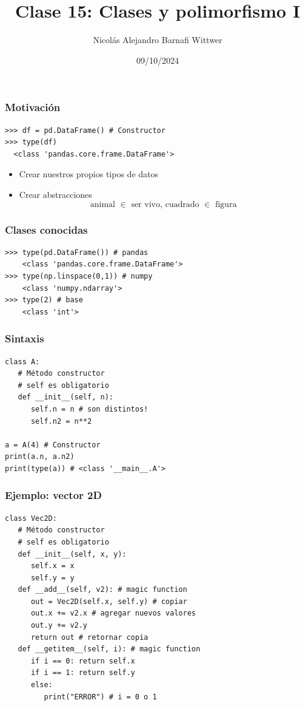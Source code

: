 \documentclass[14pt,aspectratio=169,xcolor=dvipsnames]{beamer}
\title[short title]{Clase 15: Clases y polimorfismo I}
\subtitle{}
\author[NA Barnafi] {Nicolás Alejandro Barnafi Wittwer}
\institute[UC|CMM] 
{
    Pontificia Universidad Católica de Chile \\
    Centro de Modelamiento Matemático
}
\date{09/10/2024}
\begin{document}
\begin{frame}
    \maketitle
\end{frame}
\begin{frame}[fragile]\frametitle{Motivación}
    \begin{verbatim}
>>> df = pd.DataFrame() # Constructor
>>> type(df)
  <class 'pandas.core.frame.DataFrame'>
    \end{verbatim}
    \begin{itemize}
        \item Crear nuestros propios tipos de datos
        \item Crear abstracciones 
    \[ \text{animal $\in$ ser vivo, cuadrado $\in$ figura }\]
    \end{itemize}
\end{frame}
\begin{frame}[fragile]\frametitle{Clases conocidas}
    \begin{verbatim}
>>> type(pd.DataFrame()) # pandas
    <class 'pandas.core.frame.DataFrame'>
>>> type(np.linspace(0,1)) # numpy
    <class 'numpy.ndarray'>
>>> type(2) # base
    <class 'int'>
    \end{verbatim}
\end{frame}
\begin{frame}[fragile]\frametitle{Sintaxis}
    \begin{verbatim}
class A:
   # Método constructor
   # self es obligatorio
   def __init__(self, n):
      self.n = n # son distintos!
      self.n2 = n**2

a = A(4) # Constructor
print(a.n, a.n2)
print(type(a)) # <class '__main__.A'>
    \end{verbatim}

\end{frame}
\begin{frame}[fragile]\frametitle{Ejemplo: vector 2D}
    \begin{footnotesize}
    \begin{verbatim}
class Vec2D:
   # Método constructor
   # self es obligatorio
   def __init__(self, x, y):
      self.x = x 
      self.y = y
   def __add__(self, v2): # magic function
      out = Vec2D(self.x, self.y) # copiar
      out.x += v2.x # agregar nuevos valores
      out.y += v2.y
      return out # retornar copia
   def __getitem__(self, i): # magic function
      if i == 0: return self.x
      if i == 1: return self.y
      else:
         print("ERROR") # i = 0 o 1
    \end{verbatim}
    \end{footnotesize}
\end{frame}
\end{document}
